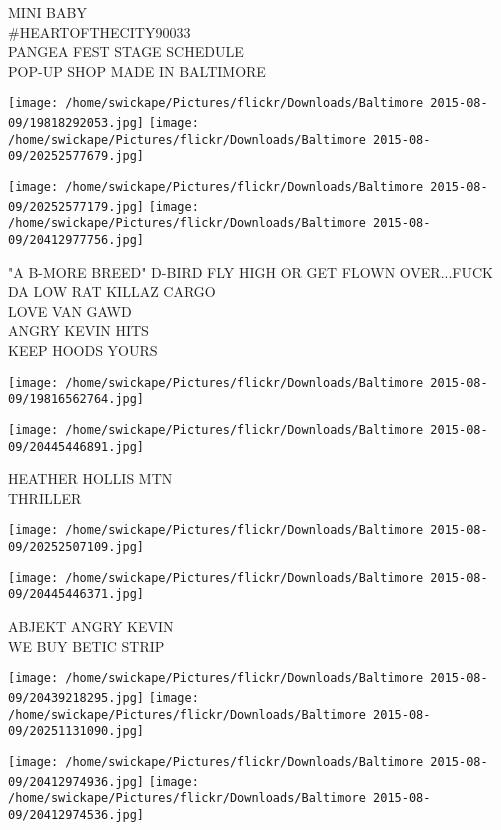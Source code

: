 \documentclass[10pt,letterpaper]{article}
\begin{document}
MINI BABY\\
\#HEARTOFTHECITY90033\\
PANGEA FEST STAGE SCHEDULE\\
POP{-}UP SHOP MADE IN BALTIMORE\\
\pagebreak

\texttt{[image: /home/swickape/Pictures/flickr/Downloads/Baltimore 2015-08-09/19818292053.jpg]}
\texttt{[image: /home/swickape/Pictures/flickr/Downloads/Baltimore 2015-08-09/20252577679.jpg]}

\texttt{[image: /home/swickape/Pictures/flickr/Downloads/Baltimore 2015-08-09/20252577179.jpg]}
\texttt{[image: /home/swickape/Pictures/flickr/Downloads/Baltimore 2015-08-09/20412977756.jpg]}

"A B{-}MORE BREED" D{-}BIRD FLY HIGH OR GET FLOWN OVER...FUCK DA LOW RAT KILLAZ CARGO\\
LOVE VAN GAWD\\
ANGRY KEVIN HITS\\
KEEP HOODS YOURS\\
\pagebreak

\texttt{[image: /home/swickape/Pictures/flickr/Downloads/Baltimore 2015-08-09/19816562764.jpg]}

\vspace{0.25in}
\texttt{[image: /home/swickape/Pictures/flickr/Downloads/Baltimore 2015-08-09/20445446891.jpg]}

HEATHER HOLLIS MTN\\
THRILLER\\
\pagebreak

\texttt{[image: /home/swickape/Pictures/flickr/Downloads/Baltimore 2015-08-09/20252507109.jpg]}

\vspace{0.25in}
\texttt{[image: /home/swickape/Pictures/flickr/Downloads/Baltimore 2015-08-09/20445446371.jpg]}

ABJEKT ANGRY KEVIN\\
WE BUY BETIC STRIP\\
\pagebreak

\texttt{[image: /home/swickape/Pictures/flickr/Downloads/Baltimore 2015-08-09/20439218295.jpg]}
\texttt{[image: /home/swickape/Pictures/flickr/Downloads/Baltimore 2015-08-09/20251131090.jpg]}

\texttt{[image: /home/swickape/Pictures/flickr/Downloads/Baltimore 2015-08-09/20412974936.jpg]}
\texttt{[image: /home/swickape/Pictures/flickr/Downloads/Baltimore 2015-08-09/20412974536.jpg]}
\end{document}
